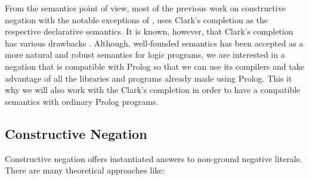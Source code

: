 \documentclass{tlp}
\begin{document}
From the semantics point of view, most of the previous work on constructive
negation with the notable exceptions of \cite{Damasio,Drabent,Przymusinski2},
uses Clark's completion as the respective declarative semantics. It is known,
however, that Clark's completion has various drawbacks
\cite{Przymusinski3}. Although, well-founded semantics \cite{VGelder} has been
accepted as a more natural and robust semantics for logic programs, we are
interested in a negation that is compatible with Prolog so that we can use its
compilers and take advantage of all the libraries and programs already
made using
Prolog. This it why we will also work with the Clark's completion in
order to have a compatible semantics with ordinary Prolog programs.

\subsection{Constructive Negation}

Constructive negation offers instantiated answers to non-ground negative
literals. There are many theoretical approaches like:
\end{document}
